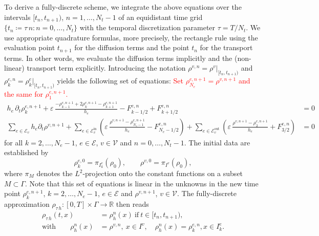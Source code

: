 To derive a fully-discrete scheme, we integrate the above equations over the intervals $[t_n, t_{n+1})$, $n=1, \ldots, N_t-1$ of an equidistant time grid $\{ t_n \coloneqq \tau\,n \colon n = 0, \ldots, N_t \}$ with the temporal discretization parameter $\tau = T/N_t$. We use appropriate quadrature formulas, more precisely, the rectangle rule using the evaluation point $t_{n+1}$ for the diffusion terms and the point $t_n$ for the transport terms. In other words, we evaluate the diffusion terms implicitly and the (non-linear) transport term explicitly. Introducing the notation $\rho^{v,n} = \rho^v|_{[t_n,t_{n+1})}$ and $\rho_k^{e,n} = \rho_k^e|_{[t_n,t_{n+1})}$ yields the following set of equations: \textcolor{red}{Set $\rho^{e,n+1}_{N_e} = \rho^{v,n+1}$ and the same for $\rho^{e,n+1}_1$.}
\begin{subequations}
    \label{eq:fully_discrete_fvm}
    \begin{align}
        h_e\,\partial_t \rho_k^{e,n+1} + \varepsilon\,\frac{-\rho_{k-1}^{e,n+1} +
        2\rho_k^{e,n+1} - \rho_{k+1}^{e,n+1}}{h_e} - F_{k-1/2}^{e,n} +
        F_{k+1/2}^{e,n} &= 0 \\	
        \sum_{e\in \mathcal{E}_v} h_e\partial_t\rho^{v,n+1}
        + \sum_{e\in \mathcal{E}_v^{\text{in}}}
        \left(\varepsilon\,\frac{\rho^{v,n+1}-\rho_{N_e-1}^{e,n+1}}{h_e} -
        F^{e,n}_{N_e-1/2}\right)
        + \sum_{e\in \mathcal{E}_v^{\text{out}}}
        \left(\varepsilon\,\frac{\rho^{v,n+1}-\rho_2^{e,n+1}}{h_e} + F^{e,n}_{3/2}\right)
        &= 0
    \end{align}
\end{subequations}
for all $k = 2, \ldots, N_e-1$, $e \in \mathcal{E}$, $v \in \mathcal{V}$ and $n = 0, \ldots, N_t - 1$. The initial data are established by
\begin{equation*}
	\rho_k^{e,0}=\pi_{I_k^e}(\rho_0),\qquad \rho^{v,0} = \pi_{I^v}(\rho_0),
\end{equation*}
where $\pi_M$ denotes the $L^2$-projection onto the constant functions on a subset $M \subset \Gamma$. Note that this set of equations is linear in the unknowns in the new time point $\rho_k^{e,n+1}$, $k = 2, \ldots, N_e-1$, $ e \in \mathcal{E}$ and $\rho^{v,n+1}$, $v \in \mathcal{V}$. The fully-discrete approximation $\rho_{\tau\,h}\colon [0,T]\times \Gamma\to \mathbb{R}$ then reads
\begin{align*}
	\rho_{\tau\,h}(t,x) &= \rho_h^n(x)\ \text{if}\ t\in [t_n,t_{n+1}),\\
	\text{with}\qquad \rho_h^n(x) &= \rho^{v,n},\ x\in I^v,\quad \rho_h^n(x)
	= \rho_k^{e,n}, x\in I_k^e.
\end{align*}
